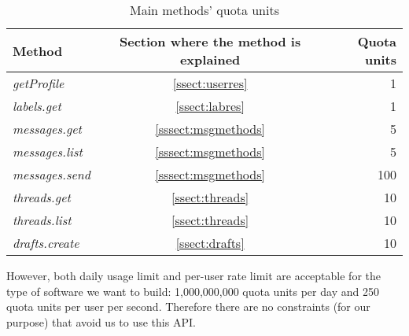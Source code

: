 \begin{table}[h]
	\centering
	\begin{tabular}{|l c r|}
		\hline
		\textbf{Method} & \textbf{Section where the method is explained} & \textbf{Quota units} \\
		\hline\hline
		\textit{getProfile} & \ref{ssect:userres} & 1\\ \hline
		\textit{labels.get} & \ref{ssect:labres} & 1\\ \hline
		\textit{messages.get} & \ref{sssect:msgmethods} & 5\\ \hline
		\textit{messages.list} & \ref{sssect:msgmethods} & 5\\ \hline
		\textit{messages.send} & \ref{sssect:msgmethods} & 100\\ \hline
		\textit{threads.get} & \ref{ssect:threads} & 10\\ \hline
		\textit{threads.list} & \ref{ssect:threads} & 10\\ \hline
		\textit{drafts.create} & \ref{ssect:drafts} & 10\\ \hline
	\end{tabular}
	\caption{Main methods' quota units}
	\label{tab:quotaUnits}
\end{table}

However, both daily usage limit and per-user rate limit are acceptable for the type of software we want to build: 1,000,000,000 quota units per day and 250 quota units per user per second. Therefore there are no constraints (for our purpose) that avoid us to use this API.
